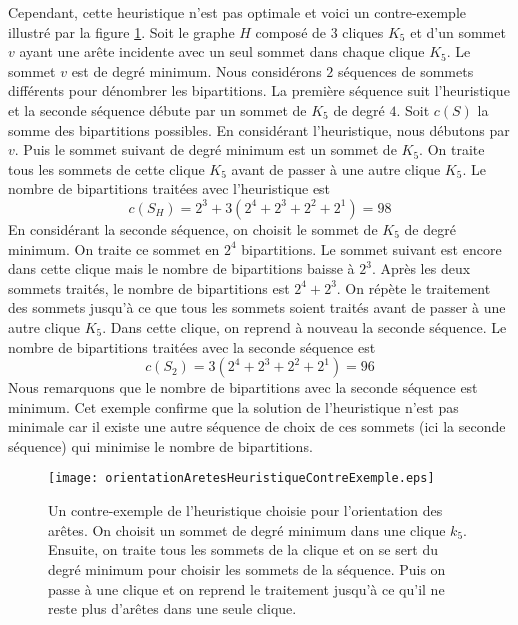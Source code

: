\vspace{-0.5cm}
Cependant, cette heuristique n'est pas optimale et voici un contre-exemple illustr\'e par la figure \ref{orientationAretesHeuristiqueContreExemple}. \newline
Soit le graphe $H$ compos\'e de $3$ cliques $K_5$ et d'un sommet $v$ ayant une ar\^ete incidente avec un seul sommet dans chaque clique $K_5$.
Le sommet $v$ est de degr\'e minimum. 
Nous consid\'erons $2$ s\'equences de sommets diff\'erents pour d\'enombrer les bipartitions. 
La premi\`ere s\'equence suit l'heuristique et la seconde s\'equence d\'ebute par un sommet de $K_5$ de degr\'e $4$. 
\newline
Soit $c(S)$ la somme des bipartitions possibles.  
En consid\'erant l'heuristique, nous d\'ebutons par $v$. 
Puis le sommet suivant de degr\'e minimum est un sommet de $K_5$. On traite tous les sommets de cette clique $K_5$ avant de passer \`a une autre clique $K_5$.
Le nombre de bipartitions trait\'ees avec  l'heuristique est 
$$
	c(S_H) = 2^3 + 3(  2^4 + 2^3+ 2^2 +2^1) = 98
$$
En consid\'erant la seconde s\'equence, on choisit le sommet de $K_5$ de degr\'e minimum. On traite ce sommet en $2^4$ bipartitions. Le sommet suivant est encore dans cette clique mais le nombre de bipartitions baisse \`a $2^3$.
Apr\`es les deux sommets trait\'es, le nombre de bipartitions est $2^4+2^3$.
On r\'ep\`ete le traitement des sommets jusqu'\`a ce que tous les sommets soient trait\'es avant de passer \`a une autre clique $K_5$. 
Dans cette clique, on reprend \`a nouveau la seconde s\'equence.
Le nombre de bipartitions  trait\'ees avec la seconde s\'equence est 
$$
	c(S_2) = 3(  2^4 + 2^3+ 2^2 +2^1) = 96
$$
Nous remarquons que le nombre de bipartitions avec la seconde s\'equence est minimum.
Cet exemple confirme que la solution de l'heuristique n'est pas minimale car il existe une autre s\'equence de choix de ces sommets (ici la seconde  s\'equence) qui minimise le nombre de bipartitions. 
\begin{figure}[htb!] 
\centering
\texttt{[image: orientationAretesHeuristiqueContreExemple.eps]}
\caption{ Un contre-exemple de l'heuristique choisie pour l'orientation des ar\^etes.
		 On choisit un sommet de degr\'e minimum dans une clique $k_5$. Ensuite, on traite tous les sommets de la clique et on se sert du degr\'e minimum pour choisir les sommets de la s\'equence. Puis on passe \`a une clique et on reprend le traitement jusqu'\`a ce qu'il ne reste plus d'ar\^etes dans une seule clique.
		}
\label{orientationAretesHeuristiqueContreExemple}
\end{figure}
\FloatBarrier

